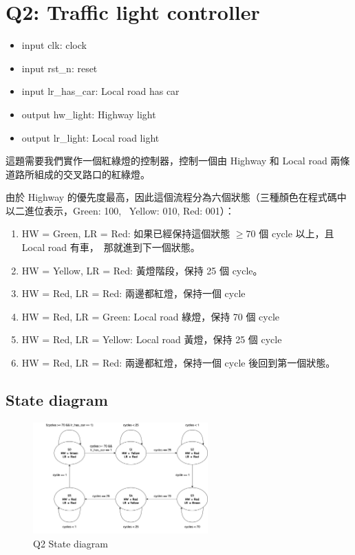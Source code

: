\documentclass[10.5pt,compsoc,UTF8]{CjC}
\theoremstyle{mystyle}
\begin{document}
\section{Q2: Traffic light controller}

\begin{itemize}
  \item input clk: clock
  \item input rst\_n: reset
  \item input lr\_has\_car: Local road has car
  \item output hw\_light: Highway light
  \item output lr\_light: Local road light
\end{itemize}

這題需要我們實作一個紅綠燈的控制器，控制一個由 Highway 和 Local road 兩條道路所組成的交叉路口的紅綠燈。
\par
由於 Highway 的優先度最高，因此這個流程分為六個狀態（三種顏色在程式碼中以二進位表示，Green: 100, \
Yellow: 010, Red: 001）：
\begin{enumerate}
  \item HW = Green, LR = Red: 如果已經保持這個狀態 $\ge 70$ 個 cycle 以上，且 Local road 有車，\
        那就進到下一個狀態。
  \item HW = Yellow, LR = Red: 黃燈階段，保持 25 個 cycle。
  \item HW = Red, LR = Red: 兩邊都紅燈，保持一個 cycle
  \item HW = Red, LR = Green: Local road 綠燈，保持 70 個 cycle
  \item HW = Red, LR = Yellow: Local road 黃燈，保持 25 個 cycle
  \item HW = Red, LR = Red: 兩邊都紅燈，保持一個 cycle 後回到第一個狀態。
\end{enumerate}

\subsection{State diagram}
\begin{figure}[h!]
  \centering
  \includegraphics[width=0.6\textwidth]{./img/Q2-state.png}
  \caption{Q2 State diagram}
  \label{fig:Q2-state}
\end{figure}
\end{document}
